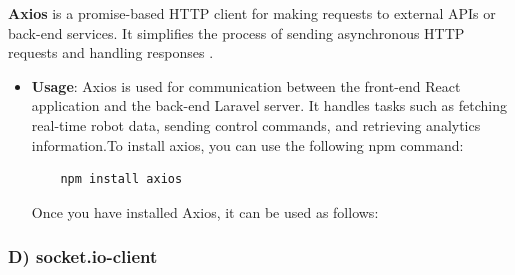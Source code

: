 \textbf{Axios} is a promise-based HTTP client for making requests to external APIs or back-end services. It simplifies the process of sending asynchronous HTTP requests and handling responses \cite{axios}.
\vspace{-2mm}
\begin{itemize}
    \item \textbf{Usage}: Axios is used for communication between the front-end React application and the back-end Laravel server. It handles tasks such as fetching real-time robot data, sending control commands, and retrieving analytics information.To install axios, you can use the following
npm command:
        \begin{verbatim}
    npm install axios
    \end{verbatim}
    \vspace{-3mm}
    Once you have installed Axios, it can be used as follows:
    \vspace{1mm}
    
    \newpage
    
\end{itemize}

\subsubsection*{D) socket.io-client}

